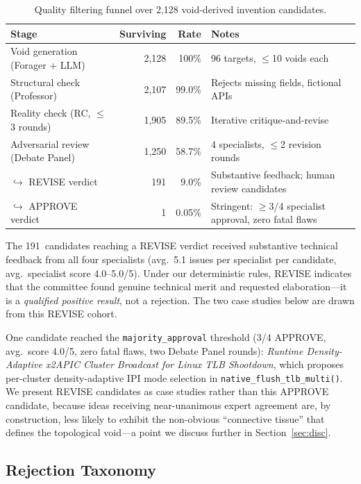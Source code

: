 \documentclass[11pt,twocolumn]{article}
\begin{document}
\begin{table}[t]
\centering
\small
\caption{Quality filtering funnel over 2,128 void-derived invention candidates.}
\label{tab:funnel}
\setlength{\tabcolsep}{6pt}
\begin{tabular}{lrr p{5.5cm}}
\toprule
Stage & Surviving & Rate & Notes \\
\midrule
Void generation (Forager + LLM) & 2,128 & 100\% & 96 targets, $\leq$10 voids each \\
Structural check (Professor)    & 2,107 & 99.0\% & Rejects missing fields, fictional APIs \\
Reality check (RC, $\leq$3 rounds) & 1,905 & 89.5\% & Iterative critique-and-revise \\
Adversarial review (Debate Panel)  & 1,250 & 58.7\% & 4 specialists, $\leq$2 revision rounds \\
\quad$\hookrightarrow$ REVISE verdict & 191 & 9.0\% & Substantive feedback; human review candidates \\
\quad$\hookrightarrow$ APPROVE verdict &   1 & 0.05\% & Stringent: $\geq$3/4 specialist approval, zero fatal flaws \\
\bottomrule
\end{tabular}
\end{table}

The 191~candidates reaching a REVISE verdict received substantive
technical feedback from all four specialists (avg.\ 5.1 issues per
specialist per candidate, avg.\ specialist score 4.0--5.0/5).
Under our deterministic rules, REVISE indicates that the committee
found genuine technical merit and requested elaboration---it is a
\emph{qualified positive result}, not a rejection.
The two case studies below are drawn from this REVISE cohort.

One candidate reached the \texttt{majority\_approval} threshold
(3/4 APPROVE, avg.\ score 4.0/5, zero fatal flaws, two Debate Panel
rounds): \emph{Runtime Density-Adaptive x2APIC Cluster Broadcast
for Linux TLB Shootdown}, which proposes per-cluster density-adaptive
IPI mode selection in \texttt{native\_flush\_tlb\_multi()}.
We present REVISE candidates as case studies rather than this APPROVE
candidate, because ideas receiving near-unanimous expert agreement
are, by construction, less likely to exhibit the non-obvious
``connective tissue'' that defines the topological void---a point
we discuss further in Section~\ref{sec:disc}.

\subsection{Rejection Taxonomy}
\end{document}
